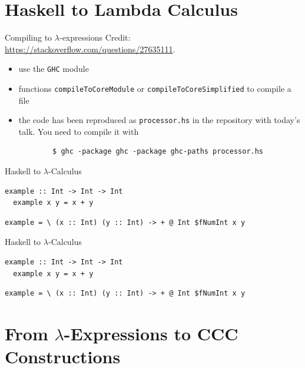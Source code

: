 \documentclass[10pt]{beamer}
\newcommand{\credit}[1]{{\footnotesize #1}}
\theoremstyle{definition}
\theoremstyle{remark}
\numberwithin{equation}{section}
\begin{document}
\section{Haskell to Lambda Calculus}

\begin{frame}[fragile]{Compiling to $\lambda$-expressions}
  \credit{Credit: \url{https://stackoverflow.com/questions/27635111}.}
  \begin{itemize}
    \item use the \lstinline{GHC} module
    \item functions \lstinline{compileToCoreModule} or \lstinline{compileToCoreSimplified} to compile a file
    \item the code has been reproduced as \lstinline{processor.hs} in the repository with today's talk. You need to compile it with
      \begin{lstlisting}
        $ ghc -package ghc -package ghc-paths processor.hs
      \end{lstlisting}
  \end{itemize}
\end{frame}

\begin{frame}[fragile]{Haskell to $\lambda$-Calculus}
  \begin{lstlisting}[frame=single]
  example :: Int -> Int -> Int
  example x y = x + y
  \end{lstlisting}

  \begin{lstlisting}[frame=single]
  example = \ (x :: Int) (y :: Int) -> + @ Int $fNumInt x y
  \end{lstlisting}
\end{frame}

\begin{frame}[fragile]{Haskell to $\lambda$-Calculus}
  \begin{lstlisting}[frame=single]
  example :: Int -> Int -> Int
  example x y = x + y
  \end{lstlisting}

  \begin{lstlisting}[frame=single]
  example = \ (x :: Int) (y :: Int) -> + @ Int $fNumInt x y
  \end{lstlisting}
\end{frame}


\section{From $\lambda$-Expressions to CCC Constructions}
\end{document}
